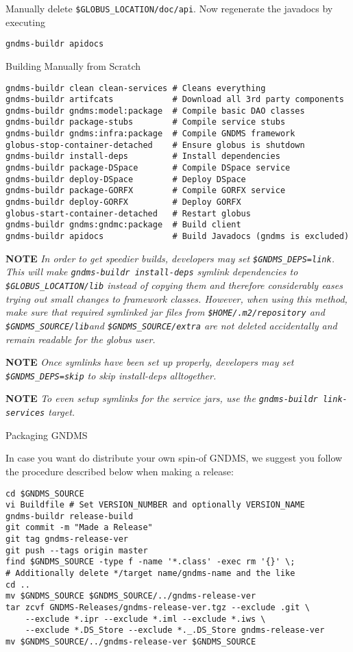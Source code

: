 \documentclass{article}
\begin{document}
Manually delete \verb!$GLOBUS_LOCATION/doc/api!. Now regenerate the
javadocs by executing

\begin{verbatim}
gndms-buildr apidocs
\end{verbatim}
Building Manually from Scratch

\begin{verbatim}
gndms-buildr clean clean-services # Cleans everything
gndms-buildr artifcats            # Download all 3rd party components
gndms-buildr gndms:model:package  # Compile basic DAO classes
gndms-buildr package-stubs        # Compile service stubs
gndms-buildr gndms:infra:package  # Compile GNDMS framework
globus-stop-container-detached    # Ensure globus is shutdown
gndms-buildr install-deps         # Install dependencies
gndms-buildr package-DSpace       # Compile DSpace service
gndms-buildr deploy-DSpace        # Deploy DSpace
gndms-buildr package-GORFX        # Compile GORFX service
gndms-buildr deploy-GORFX         # Deploy GORFX
globus-start-container-detached   # Restart globus
gndms-buildr gndms:gndmc:package  # Build client
gndms-buildr apidocs              # Build Javadocs (gndms is excluded)
\end{verbatim}

\textbf{NOTE}
\emph{In order to get speedier builds, developers may set \texttt{\$GNDMS\_DEPS=link}. This will make \texttt{gndms-buildr install-deps} symlink dependencies to \texttt{\$GLOBUS\_LOCATION/lib} instead of copying them and therefore considerably eases trying out small changes to framework classes. However, when using this method, make sure that required symlinked jar files from \texttt{\$HOME/.m2/repository} and \texttt{\$GNDMS\_SOURCE/lib}and \texttt{\$GNDMS\_SOURCE/extra} are not deleted accidentally and remain readable for the globus user.}

\textbf{NOTE}
\emph{Once symlinks have been set up properly, developers may set \texttt{\$GNDMS\_DEPS=skip} to skip install-deps alltogether.}

\textbf{NOTE}
\emph{To even setup symlinks for the service jars, use the \texttt{gndms-buildr link-services} target.}

Packaging GNDMS

In case you want do distribute your own spin-of GNDMS, we suggest
you follow the procedure described below when making a release:

\begin{verbatim}
cd $GNDMS_SOURCE
vi Buildfile # Set VERSION_NUMBER and optionally VERSION_NAME
gndms-buildr release-build
git commit -m "Made a Release"
git tag gndms-release-ver
git push --tags origin master
find $GNDMS_SOURCE -type f -name '*.class' -exec rm '{}' \;
# Additionally delete */target name/gndms-name and the like
cd ..
mv $GNDMS_SOURCE $GNDMS_SOURCE/../gndms-release-ver
tar zcvf GNDMS-Releases/gndms-release-ver.tgz --exclude .git \
    --exclude *.ipr --exclude *.iml --exclude *.iws \
    --exclude *.DS_Store --exclude *._.DS_Store gndms-release-ver
mv $GNDMS_SOURCE/../gndms-release-ver $GNDMS_SOURCE
\end{verbatim}
\end{document}
